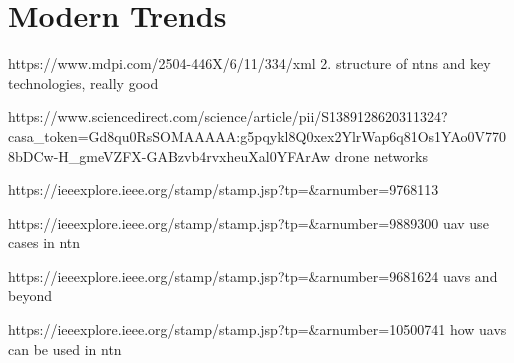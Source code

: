 \chapter{Modern Trends}\label{ch:modern_trends}


https://www.mdpi.com/2504-446X/6/11/334/xml
2. structure of ntns and key technologies, really good

https://www.sciencedirect.com/science/article/pii/S1389128620311324?casa_token=Gd8qu0RsSOMAAAAA:g5pqykl8Q0xex2YlrWap6q81Os1YAo0V7708bDCw-H_gmeVZFX-GABzvb4rvxheuXal0YFArAw
drone networks

https://ieeexplore.ieee.org/stamp/stamp.jsp?tp=&arnumber=9768113

https://ieeexplore.ieee.org/stamp/stamp.jsp?tp=&arnumber=9889300
uav use cases in ntn

https://ieeexplore.ieee.org/stamp/stamp.jsp?tp=&arnumber=9681624
uavs and beyond

https://ieeexplore.ieee.org/stamp/stamp.jsp?tp=&arnumber=10500741
how uavs can be used in ntn
